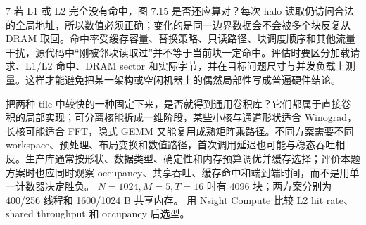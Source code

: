 \begin{solutionexercise}{7}
若 L1 或 L2 完全没有命中，图 7.15 是否还应算对？每次 halo 读取仍访问合法的全局地址，所以数值必须正确；变化的是同一边界数据会不会被多个块反复从 DRAM 取回。命中率受缓存容量、替换策略、只读路径、块调度顺序和其他流量干扰，源代码中“刚被邻块读取过”并不等于当前块一定命中。评估时要区分加载请求、L1/L2 命中、DRAM sector 和实际字节，并在目标问题尺寸与并发负载上测量。这样才能避免把某一架构或空闲机器上的偶然局部性写成普遍硬件结论。

把两种 tile 中较快的一种固定下来，是否就得到通用卷积库？它们都属于直接卷积的局部实现；可分离核能拆成一维阶段，某些小核与通道形状适合 Winograd，长核可能适合 FFT，隐式 GEMM 又能复用成熟矩阵乘路径。不同方案需要不同 workspace、预处理、布局变换和数值路径，首次调用延迟也可能与稳态吞吐相反。生产库通常按形状、数据类型、确定性和内存预算调优并缓存选择；评价本题方案时也应同时观察 occupancy、共享吞吐、缓存命中和端到端时间，而不是用单一计数器决定胜负。
\variantheading $N=1024,M=5,T=16$ 时有 4096 块；两方案分别为 400/256 线程和 1600/1024 B 共享内存。
\practiceheading 用 Nsight Compute 比较 L2 hit rate、shared throughput 和 occupancy 后选型。
\end{solutionexercise}

